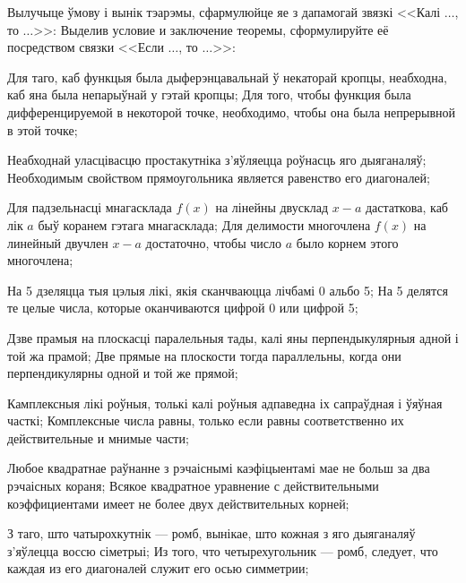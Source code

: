 




\begin{problemList}
\problemItemSimple
{Вылучыце ўмову і вынік тэарэмы, сфармулюйце яе з дапамогай звязкі <<Калі $\ldots$, то $\ldots$>>:}
{Выделив условие и заключение теоремы, сформулируйте её посредством связки <<Если $\ldots$, то $\ldots$>>:}

\begin{belarusianEnumerate}

\problemItemSimple
{Для таго, каб функцыя была дыферэнцавальнай ў некаторай кропцы, неабходна, каб яна была непарыўнай у гэтай кропцы;}
{Для того, чтобы функция была дифференцируемой в некоторой точке, необходимо, чтобы она была непрерывной в этой точке;}

\problemItemSimple
{Неабходнай уласцівасцю простакутніка з'яўляецца роўнасць яго дыяганаляў;}
{Необходимым свойством прямоугольника является равенство его диагоналей;}

\problemItemSimple
{Для падзельнасці мнагасклада $f(x)$ на лінейны двусклад $x - a$ дастаткова, каб лік $a$ быў коранем гэтага мнагасклада;}
{Для делимости многочлена $f(x)$ на линейный двучлен $x - a$ достаточно, чтобы число $a$ было корнем этого многочлена;}

\problemItemSimple
{На 5 дзеляцца тыя цэлыя лікі, якія сканчваюцца лічбамі 0 альбо 5;}
{На 5 делятся те целые числа, которые оканчиваются цифрой 0 или цифрой 5;}

\problemItemSimple
{Дзве прамыя на плоскасці паралельныя тады, калі яны перпендыкулярныя адной і той жа прамой;}
{Две прямые на плоскости тогда параллельны, когда они перпендикулярны одной и той же прямой;}

\problemItemSimple
{Камплексныя лікі роўныя, толькі калі роўныя адпаведна іх сапраўдная і ўяўная часткі;}
{Комплексные числа равны, только если равны соответственно их действительные и мнимые части;}

\problemItemSimple
{Любое квадратнае раўнанне з рэчаіснымі каэфіцыентамі мае не больш за два рэчаісных кораня;}
{Всякое квадратное уравнение с действительными коэффициентами имеет не более двух действительных корней;}

\problemItemSimple
{З таго, што чатырохкутнік --- ромб, вынікае, што кожная з яго дыяганаляў з'яўлецца воссю сіметрыі;}
{Из того, что четырехугольник --- ромб, следует, что каждая из его диагоналей служит его осью симметрии;}


\end{belarusianEnumerate}
\end{problemList}
